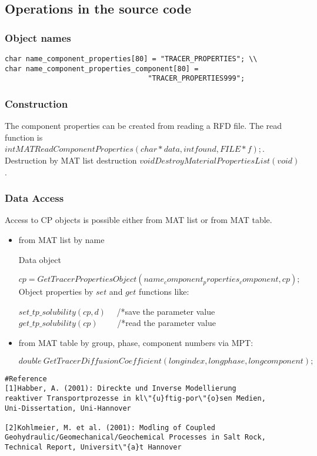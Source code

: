 \subsection{Operations in the source code}
\subsubsection{Object names}

\begin{verbatim}
char name_component_properties[80] = "TRACER_PROPERTIES"; \\
char name_component_properties_component[80] =
                                  "TRACER_PROPERTIES999";
\end{verbatim}

\subsubsection{Construction}

The component properties can be created from reading a RFD file.
The read function is $int MATReadComponentProperties(char *data,
int found, FILE * f);$. Destruction by MAT list destruction $void
DestroyMaterialPropertiesList(void)$.

\subsubsection{Data Access}

Access to CP objects is possible either from MAT list or from MAT
table.

\begin{itemize}
  \item from MAT list by name

  Data object

  $cp = GetTracerPropertiesObject(name_component_properties_component,
  cp);$
\\
  Object properties by $set$ and $get$ functions like:

  $set\_tp\_solubility(cp, d)$  \ \ /*save the parameter value \\
  $get\_tp\_solubility(cp)$   \ \ \ \   /*read the parameter value

  \item from MAT table by group, phase, component numbers via MPT:

  $double\ GetTracerDiffusionCoefficient(long index, long phase, long component);$
\end{itemize}



\begin{verbatim}
#Reference
[1]Habber, A. (2001): Direckte und Inverse Modellierung
reaktiver Transportprozesse in kl\"{u}ftig-por\"{o}sen Medien,
Uni-Dissertation, Uni-Hannover

[2]Kohlmeier, M. et al. (2001): Modling of Coupled
Geohydraulic/Geomechanical/Geochemical Processes in Salt Rock,
Technical Report, Universit\"{a}t Hannover

\end{verbatim}
